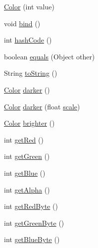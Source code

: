 \begin{DoxyCompactItemize}
\item 
\mbox{\hyperlink{classorg_1_1newdawn_1_1slick_1_1_color_ac2e3e43946a36016884d05df8e9fa27e}{Color}} (int value)
\item 
void \mbox{\hyperlink{classorg_1_1newdawn_1_1slick_1_1_color_ae4b71c94854f7983f2ccdb7340438e23}{bind}} ()
\item 
int \mbox{\hyperlink{classorg_1_1newdawn_1_1slick_1_1_color_a5e500cb43fc36af2e9ad8030b6766240}{hash\+Code}} ()
\item 
boolean \mbox{\hyperlink{classorg_1_1newdawn_1_1slick_1_1_color_afb41da8a2f86595dc51c6a2e9712027e}{equals}} (Object other)
\item 
String \mbox{\hyperlink{classorg_1_1newdawn_1_1slick_1_1_color_aa74625688220b3296e342ae23eabf2e9}{to\+String}} ()
\item 
\mbox{\hyperlink{classorg_1_1newdawn_1_1slick_1_1_color}{Color}} \mbox{\hyperlink{classorg_1_1newdawn_1_1slick_1_1_color_a73c0dbf7349167bcc646ff07cff719a1}{darker}} ()
\item 
\mbox{\hyperlink{classorg_1_1newdawn_1_1slick_1_1_color}{Color}} \mbox{\hyperlink{classorg_1_1newdawn_1_1slick_1_1_color_a3795be826980a3b60fdab1e7d811104a}{darker}} (float \mbox{\hyperlink{classorg_1_1newdawn_1_1slick_1_1_color_a53597f62e247b2193191c3c2a9828fa1}{scale}})
\item 
\mbox{\hyperlink{classorg_1_1newdawn_1_1slick_1_1_color}{Color}} \mbox{\hyperlink{classorg_1_1newdawn_1_1slick_1_1_color_aa777c7394220e0eccf10ed9235252832}{brighter}} ()
\item 
int \mbox{\hyperlink{classorg_1_1newdawn_1_1slick_1_1_color_ae608bf42430199ccdb2b1fa48a903c95}{get\+Red}} ()
\item 
int \mbox{\hyperlink{classorg_1_1newdawn_1_1slick_1_1_color_a0fceed1c8e8cf29062db08d02515884d}{get\+Green}} ()
\item 
int \mbox{\hyperlink{classorg_1_1newdawn_1_1slick_1_1_color_a56e59960da3578263fcdb513ca64001e}{get\+Blue}} ()
\item 
int \mbox{\hyperlink{classorg_1_1newdawn_1_1slick_1_1_color_a82aae8104a9657925af03ab0da1bc4f2}{get\+Alpha}} ()
\item 
int \mbox{\hyperlink{classorg_1_1newdawn_1_1slick_1_1_color_a58a2471bc87556182c276c4d2ab24b36}{get\+Red\+Byte}} ()
\item 
int \mbox{\hyperlink{classorg_1_1newdawn_1_1slick_1_1_color_a79aa0550120abbbf5a9fbaafe9ca74ec}{get\+Green\+Byte}} ()
\item 
int \mbox{\hyperlink{classorg_1_1newdawn_1_1slick_1_1_color_aaf9bf5fc9f16893ba52c4bc82f27069b}{get\+Blue\+Byte}} ()

\end{DoxyCompactItemize}
